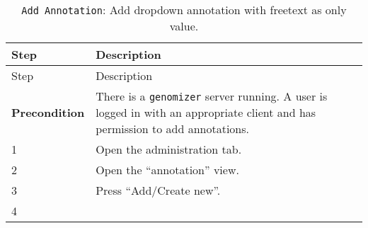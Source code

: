 \begin{longtable}[c]{@{}ll@{}}
\caption{\texttt{Add\ Annotation}: Add dropdown annotation with freetext
as only value.}\tabularnewline
\toprule
\begin{minipage}[b]{0.31\columnwidth}\raggedright\strut
Step
\strut\end{minipage} &
\begin{minipage}[b]{0.63\columnwidth}\raggedright\strut
Description
\strut\end{minipage}\tabularnewline
\midrule
\endfirsthead
\toprule
\begin{minipage}[b]{0.31\columnwidth}\raggedright\strut
Step
\strut\end{minipage} &
\begin{minipage}[b]{0.63\columnwidth}\raggedright\strut
Description
\strut\end{minipage}\tabularnewline
\midrule
\endhead
\begin{minipage}[t]{0.31\columnwidth}\raggedright\strut
\textbf{Precondition}
\strut\end{minipage} &
\begin{minipage}[t]{0.63\columnwidth}\raggedright\strut
There is a \texttt{genomizer} server running. A user is logged in with
an appropriate client and has permission to add annotations.
\strut\end{minipage}\tabularnewline
\begin{minipage}[t]{0.31\columnwidth}\raggedright\strut
1
\strut\end{minipage} &
\begin{minipage}[t]{0.63\columnwidth}\raggedright\strut
Open the administration tab.
\strut\end{minipage}\tabularnewline
\begin{minipage}[t]{0.31\columnwidth}\raggedright\strut
2
\strut\end{minipage} &
\begin{minipage}[t]{0.63\columnwidth}\raggedright\strut
Open the ``annotation'' view.
\strut\end{minipage}\tabularnewline
\begin{minipage}[t]{0.31\columnwidth}\raggedright\strut
3
\strut\end{minipage} &
\begin{minipage}[t]{0.63\columnwidth}\raggedright\strut
Press ``Add/Create new''.
\strut\end{minipage}\tabularnewline
\begin{minipage}[t]{0.31\columnwidth}\raggedright\strut
4
\strut\end{minipage} &

\end{longtable}
